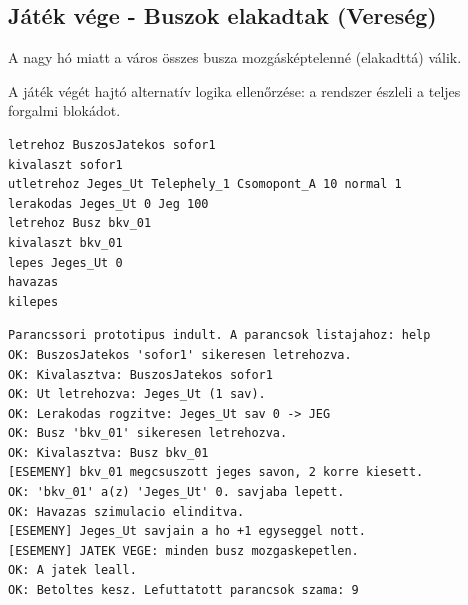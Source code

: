 \subsection{Játék vége - Buszok elakadtak (Vereség)}
\begin{test-case-description}
    A nagy hó miatt a város összes busza mozgásképtelenné (elakadttá) válik.
\end{test-case-description}
\begin{test-case-function}
    A játék végét hajtó alternatív logika ellenőrzése: a rendszer észleli a teljes forgalmi blokádot.
\end{test-case-function}
\begin{test-case-input}
\begin{verbatim}
letrehoz BuszosJatekos sofor1
kivalaszt sofor1
utletrehoz Jeges_Ut Telephely_1 Csomopont_A 10 normal 1
lerakodas Jeges_Ut 0 Jeg 100
letrehoz Busz bkv_01
kivalaszt bkv_01
lepes Jeges_Ut 0
havazas
kilepes
\end{verbatim}
\end{test-case-input}
\begin{test-case-output}
\begin{verbatim}
Parancssori prototipus indult. A parancsok listajahoz: help
OK: BuszosJatekos 'sofor1' sikeresen letrehozva.
OK: Kivalasztva: BuszosJatekos sofor1
OK: Ut letrehozva: Jeges_Ut (1 sav).
OK: Lerakodas rogzitve: Jeges_Ut sav 0 -> JEG
OK: Busz 'bkv_01' sikeresen letrehozva.
OK: Kivalasztva: Busz bkv_01
[ESEMENY] bkv_01 megcsuszott jeges savon, 2 korre kiesett.
OK: 'bkv_01' a(z) 'Jeges_Ut' 0. savjaba lepett.
OK: Havazas szimulacio elinditva.
[ESEMENY] Jeges_Ut savjain a ho +1 egyseggel nott.
[ESEMENY] JATEK VEGE: minden busz mozgaskepetlen.
OK: A jatek leall.
OK: Betoltes kesz. Lefuttatott parancsok szama: 9
\end{verbatim}
\end{test-case-output}

